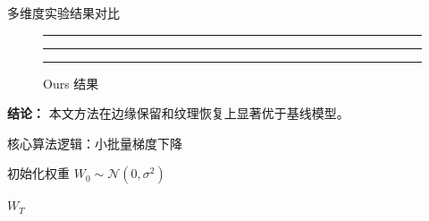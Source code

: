 \documentclass[aspectratio=169]{beamer}
\begin{document}
\begin{frame}{多维度实验结果对比}
  \begin{figure}
    \centering
    \begin{minipage}{0.31\textwidth}
      \centering
      \rule{\textwidth}{2cm} %
      \caption{输入图像}
    \end{minipage}\hfill
    \begin{minipage}{0.31\textwidth}
      \centering
      \rule{\textwidth}{2cm}
      \caption{Baseline 结果}
    \end{minipage}\hfill
    \begin{minipage}{0.31\textwidth}
      \centering
      \rule{\textwidth}{2cm}
      \caption{Ours 结果}
    \end{minipage}
  \end{figure}
  
  \vspace{0.5em}
  \textbf{结论：} 本文方法在边缘保留和纹理恢复上显著优于基线模型。
\end{frame}

\begin{frame}[fragile]{核心算法逻辑：小批量梯度下降}
  \begin{algorithm}[H]
    \caption{Mini-Batch Gradient Descent}
    \SetAlgoLined
    
    
    初始化权重 $W_0 \sim \mathcal{N}(0, \sigma^2)$\;
    
    \Return $W_T$\;
  \end{algorithm}
\end{frame}
\end{document}
